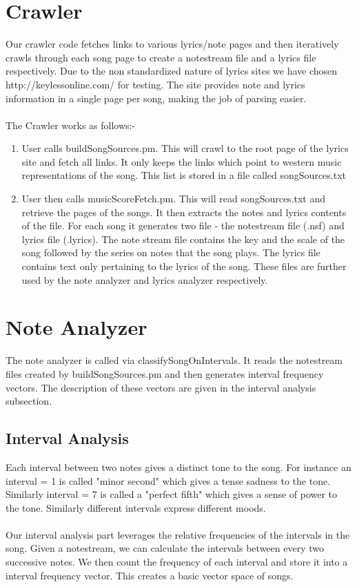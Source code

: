 \documentclass[letterpaper, 11pt]{article}
\begin{document}
\section*{Crawler}
Our crawler code fetches links to various lyrics/note pages and then iteratively crawls through each song page to create a notestream file and a lyrics file respectively. Due to the non standardized nature of lyrics sites we have chosen http://keylessonline.com/ for testing. The site provides note and lyrics information in a single page per song, making the job of parsing easier. \\\\
The Crawler works as follows:-
\begin{enumerate}
\item User calls buildSongSources.pm. This will crawl to the root page of the lyrics site and fetch all links. It only keeps the links which point to western music representations of the song. This list is stored in a file called songSources.txt
\item User then calls musicScoreFetch.pm. This will read songSources.txt and retrieve the pages of the songs. It then extracts the notes and lyrics contents of the file. For each song it generates two file - the notestream file (.nsf) and lyrics file (.lyrics). The note stream file contains the key and the scale of the song followed by the series on notes that the song plays. The lyrics file contains text only pertaining to the lyrics of the song. These files are further used by the note analyzer and lyrics analyzer respectively. 
\end{enumerate}

\section*{Note Analyzer}
The note analyzer is called via classifySongOnIntervals. It reads the notestream files created by buildSongSources.pm and then generates interval frequency vectors. The description of these vectors are given in the interval analysis subsection.
\subsection*{Interval Analysis}
Each interval between two notes gives a distinct tone to the song. For instance an interval = 1  is called "minor second" which gives a tense sadness to the tone. Similarly interval = 7 is called a "perfect fifth" which gives a sense of power to the tone. Similarly different intervals express different moods. \\\\
Our interval analysis part leverages the relative frequencies of the intervals in the song. Given a notestream, we can calculate the intervals between every two successive notes. We then count the frequency of each interval and store it into a interval frequency vector. This creates a basic vector space of songs. 
\end{document}
